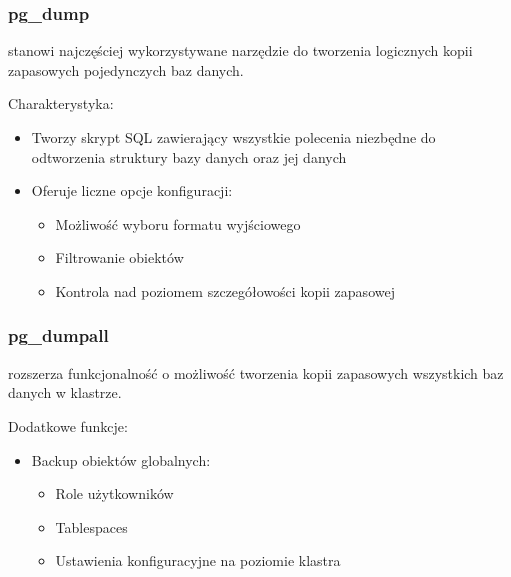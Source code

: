\documentclass[letterpaper,10pt,polish]{sphinxmanual}
\begin{document}
\subsubsection{pg\_dump}
\label{\detokenize{rozdzial2/Kopie_zapasowe_i_odzyskiwanie_danych/kopie_zapasowe_i_odzyskiwanie_danych:pg-dump}}
\sphinxAtStartPar
{} stanowi najczęściej wykorzystywane narzędzie do tworzenia logicznych kopii zapasowych pojedynczych baz danych.

\sphinxAtStartPar
Charakterystyka:
\begin{itemize}
\item {} 
\sphinxAtStartPar
Tworzy skrypt SQL zawierający wszystkie polecenia niezbędne do odtworzenia struktury bazy danych oraz jej danych

\item {} 
\sphinxAtStartPar
Oferuje liczne opcje konfiguracji:
\begin{itemize}
\item {} 
\sphinxAtStartPar
Możliwość wyboru formatu wyjściowego

\item {} 
\sphinxAtStartPar
Filtrowanie obiektów

\item {} 
\sphinxAtStartPar
Kontrola nad poziomem szczegółowości kopii zapasowej

\end{itemize}

\end{itemize}


\subsubsection{pg\_dumpall}
\label{\detokenize{rozdzial2/Kopie_zapasowe_i_odzyskiwanie_danych/kopie_zapasowe_i_odzyskiwanie_danych:pg-dumpall}}
\sphinxAtStartPar
{} rozszerza funkcjonalność  o możliwość tworzenia kopii zapasowych wszystkich baz danych w klastrze.

\sphinxAtStartPar
Dodatkowe funkcje:
\begin{itemize}
\item {} 
\sphinxAtStartPar
Backup obiektów globalnych:
\begin{itemize}
\item {} 
\sphinxAtStartPar
Role użytkowników

\item {} 
\sphinxAtStartPar
Tablespaces

\item {} 
\sphinxAtStartPar
Ustawienia konfiguracyjne na poziomie klastra

\end{itemize}

\end{itemize}
\end{document}
